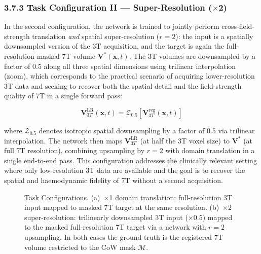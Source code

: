 \subsubsection*{3.7.3 Task Configuration II --- Super-Resolution ($\times$2)}

In the second configuration, the network is trained to jointly perform cross-field-strength translation \emph{and} spatial super-resolution ($r = 2$): the input is a spatially downsampled version of the 3T acquisition, and the target is again the full-resolution masked 7T volume $\mathbf{V}^{*}(\mathbf{x}, t)$. The 3T volumes are downsampled by a factor of 0.5 along all three spatial dimensions using trilinear interpolation (zoom), which corresponds to the practical scenario of acquiring lower-resolution 3T data and seeking to recover both the spatial detail and the field-strength quality of 7T in a single forward pass:

\begin{equation}
    \mathbf{V}^{\text{LR}}_{3T}(\mathbf{x}, t) =
        \mathcal{Z}_{0.5}\!\left[\mathbf{V}_{3T}^{\text{reg}}(\mathbf{x}, t)\right]
\end{equation}

where $\mathcal{Z}_{0.5}$ denotes isotropic spatial downsampling by a factor of 0.5 via trilinear interpolation. The network then maps $\mathbf{V}^{\text{LR}}_{3T}$ (at half the 3T voxel size) to $\mathbf{V}^{*}$ (at full 7T resolution), combining upsampling by $r = 2$ with domain translation in a single end-to-end pass. This configuration addresses the clinically relevant setting where only low-resolution 3T data are available and the goal is to recover the spatial and haemodynamic fidelity of 7T without a second acquisition.

\begin{figure}[h]
    \centering
    \caption{Task Configurations. (a)~$\times$1 domain translation: full-resolution 3T input mapped to masked 7T target at the same resolution. (b)~$\times$2 super-resolution: trilinearly downsampled 3T input ($\times 0.5$) mapped to the masked full-resolution 7T target via a network with $r=2$ upsampling. In both cases the ground truth is the registered 7T volume restricted to the CoW mask $\mathcal{M}$.}
    \label{fig:tasks}
\end{figure}

